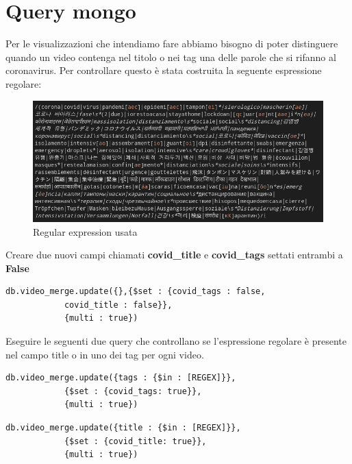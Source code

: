 \documentclass[10pt, a4paper,openany]{article}
\begin{document}
\section*{Query mongo}


Per le visualizzazioni che intendiamo fare abbiamo bisogno di poter distinguere quando un video contenga nel titolo o nei tag una delle parole che si rifanno al coronavirus. Per controllare questo è stata costruita la seguente espressione regolare:

\begin{figure}[H]
	\centering
	\includegraphics[height=0.4 \linewidth]{rexpression.png}
	\caption{Regular expression usata}
\end{figure}



Creare due nuovi campi chiamati \textbf{covid\_title} e \textbf{covid\_tags} settati entrambi a \textbf{False} 

\begin{Verbatim}[frame=single,baselinestretch=0.1]
db.video_merge.update({},{$set : {covid_tags : false, 
			covid_title : false}},
			{multi : true})
\end{Verbatim}
Eseguire le seguenti due query che controllano se l'espressione regolare è presente nel campo title o in uno dei tag per ogni video.

\begin{Verbatim}[frame=single,baselinestretch=0.1]
db.video_merge.update({tags : {$in : [REGEX]}}, 
			{$set : {covid_tags: true}}, 
			{multi : true})
\end{Verbatim}
 \begin{Verbatim}[frame=single,baselinestretch=0.1]
db.video_merge.update({title : {$in : [REGEX]}}, 
			{$set : {covid_title: true}}, 
			{multi : true})
\end{Verbatim}
\end{document}
